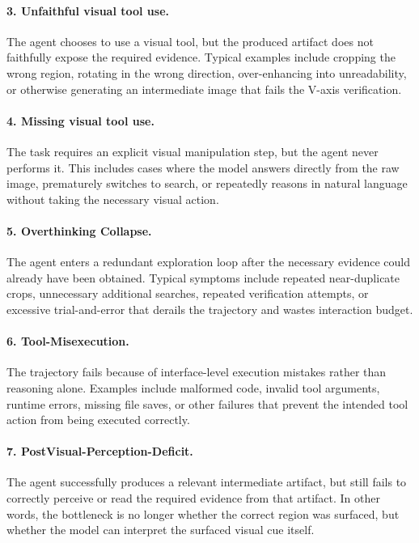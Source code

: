 \documentclass[runningheads]{llncs}
\theoremstyle{plain}
\theoremstyle{definition}
\theoremstyle{remark}
\begin{document}
\paragraph{3. Unfaithful visual tool use.}
The agent chooses to use a visual tool, but the produced artifact does not faithfully expose the required evidence. Typical examples include cropping the wrong region, rotating in the wrong direction, over-enhancing into unreadability, or otherwise generating an intermediate image that fails the V-axis verification.

\paragraph{4. Missing visual tool use.}
The task requires an explicit visual manipulation step, but the agent never performs it. This includes cases where the model answers directly from the raw image, prematurely switches to search, or repeatedly reasons in natural language without taking the necessary visual action.

\paragraph{5. Overthinking Collapse.}
The agent enters a redundant exploration loop after the necessary evidence could already have been obtained. Typical symptoms include repeated near-duplicate crops, unnecessary additional searches, repeated verification attempts, or excessive trial-and-error that derails the trajectory and wastes interaction budget.

\paragraph{6. Tool-Misexecution.}
The trajectory fails because of interface-level execution mistakes rather than reasoning alone. Examples include malformed code, invalid tool arguments, runtime errors, missing file saves, or other failures that prevent the intended tool action from being executed correctly.

\paragraph{7. PostVisual-Perception-Deficit.}
The agent successfully produces a relevant intermediate artifact, but still fails to correctly perceive or read the required evidence from that artifact. In other words, the bottleneck is no longer whether the correct region was surfaced, but whether the model can interpret the surfaced visual cue itself.
\end{document}
